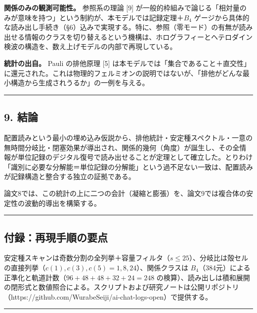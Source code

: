 \documentclass[
]{ltjsarticle}
\begin{document}
\textbf{関係のみの観測可能性。} 参照系の理論 {[}9{]}
が一般的枠組みで論じる「相対量のみが意味を持つ」という制約が、本モデルでは記録定理＋\(B_4\)
ゲージから具体的な読み出し手続き（§6）込みで実現する。特に、参照（零モード）の有無が読み出せる情報のクラスを切り替えるという機構は、ホログラフィーとヘテロダイン検波の構造を、数え上げモデルの内部で再現している。

\textbf{統計の出自。} Pauli の排他原理 {[}5{]}
は本モデルでは「集合であること＋直交性」に還元された。これは物理的フェルミオンの説明ではないが、「排他がどんな最小構造から生成されうるか」の一例を与える。

\begin{center}\rule{0.5\linewidth}{0.5pt}\end{center}

\subsection{9. 結論}\label{ux7d50ux8ad6}

配置読みという最小の埋め込み仮説から、排他統計・安定種スペクトル・一意の無時間分岐比・閉塞効果が導出され、関係的幾何（角度）が誕生し、その全情報が単位記録のデジタル復号で読み出せることが定理として確立した。とりわけ「識別に必要な分解能＝単位記録の分解能」という過不足ない一致は、配置読みが記録構造と整合する独立の証拠である。

論文8では、この統計の上に二つの会計（凝縮と膨張）を、論文9では複合体の安定性の波動的導出を構築する。

\begin{center}\rule{0.5\linewidth}{0.5pt}\end{center}

\subsection{付録：再現手順の要点}\label{ux4ed8ux9332ux518dux73feux624bux9806ux306eux8981ux70b9}

安定種スキャンは奇数分割の全列挙＋容量フィルタ（\(s\le25\)）、分岐比は殻セルの直接列挙（\(c(1),c(3),c(5)=1,8,24\)）、関係クラスは
\(B_4\)（384元）による正準化と軌道計数（\(96+48+48+32+24=248\)
の検算）、読み出しは積和展開の閉形式と数値照合による。スクリプトおよび研究ノートは公開リポジトリ（https://github.com/WurabeSeiji/ai-chat-logs-open）で提供する。

\begin{center}\rule{0.5\linewidth}{0.5pt}\end{center}
\end{document}
